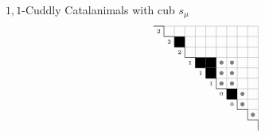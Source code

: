 \documentclass{beamer}
\newcounter{c}
\begin{document}
\begin{frame}{\(1,1\)-Cuddly Catalanimals with cub \(s_\mu\)}
\[\begin{array}{cr}
\begin{tikzpicture}[scale = .33]
\begin{scope}
\draw[draw = none, fill = gray!100] (7+0.5, -4-0.5) circle (.2);
\draw[draw = none, fill = gray!100] (8+0.5, -4-0.5) circle (.2);
\draw[draw = none, fill = gray!100] (7+0.5, -5-0.5) circle (.2);
\draw[draw = none, fill = gray!100] (8+0.5, -5-0.5) circle (.2);
\draw[draw = none, fill = gray!100] (7+0.5, -6-0.5) circle (.2);
\draw[draw = none, fill = gray!100] (8+0.5, -6-0.5) circle (.2);
\draw[draw = none, fill = gray!100] (9+0.5, -7-0.5) circle (.2);
\draw[draw = none, fill = gray!100] (9+0.5, -8-0.5) circle (.2);
\draw[draw = none, fill = gray!100] (10+0.5, -9-0.5) circle (.2);
\draw[thin, black!31] (1,-1) -- (11,-1);
\draw[thin, black!31] (2,-1) -- (2,-1);
\draw[thin, black!31] (2,-2) -- (11,-2);
\draw[thin, black!31] (3,-2) -- (3,-1);
\draw[thin, black!31] (3,-3) -- (11,-3);
\draw[thin, black!31] (4,-3) -- (4,-1);
\draw[thin, black!31] (4,-4) -- (11,-4);
\draw[thin, black!31] (5,-4) -- (5,-1);
\draw[thin, black!31] (5,-5) -- (11,-5);
\draw[thin, black!31] (6,-5) -- (6,-1);
\draw[thin, black!31] (6,-6) -- (11,-6);
\draw[thin, black!31] (7,-6) -- (7,-1);
\draw[thin, black!31] (7,-7) -- (11,-7);
\draw[thin, black!31] (8,-7) -- (8,-1);
\draw[thin, black!31] (8,-8) -- (11,-8);
\draw[thin, black!31] (9,-8) -- (9,-1);
\draw[thin, black!31] (9,-9) -- (11,-9);
\draw[thin, black!31] (10,-9) -- (10,-1);
\draw[thin, black!31] (10,-10) -- (11,-10);
\draw[thin, black!31] (11,-10) -- (11,-1);
\draw[draw = none, fill = black!100] (3,-2) rectangle (4,-3);
 \draw[draw = none, fill = black!100] (5,-4) rectangle (6,-5);
 \draw[draw = none, fill = black!100] (6,-4) rectangle (7,-5);
 \draw[draw = none, fill = black!100] (6,-5) rectangle (7,-6);
 \draw[draw = none, fill = black!100] (8,-7) rectangle (9,-8);
 \draw[thin] (1,-1) -- (2,-1);
\draw[thin] (2,-1) -- (2,-2);
\draw[thin] (2,-2) -- (3,-2);
\draw[thin] (3,-2) -- (3,-3);
\draw[thin] (3,-3) -- (4,-3);
\draw[thin] (4,-3) -- (4,-4);
\draw[thin] (4,-4) -- (5,-4);
\draw[thin] (5,-4) -- (5,-5);
\draw[thin] (5,-5) -- (6,-5);
\draw[thin] (6,-5) -- (6,-6);
\draw[thin] (6,-6) -- (7,-6);
\draw[thin] (7,-6) -- (7,-7);
\draw[thin] (7,-7) -- (8,-7);
\draw[thin] (8,-7) -- (8,-8);
\draw[thin] (8,-8) -- (9,-8);
\draw[thin] (9,-8) -- (9,-9);
\draw[thin] (9,-9) -- (10,-9);
\draw[thin] (10,-9) -- (10,-10);
\draw[thin] (10,-10) -- (11,-10);
\draw[thin] (11,-10) -- (11,-11);
\node at (3/2,-3/2) {\tiny $2 $};
\node at (5/2,-5/2) {\tiny $2 $};
\node at (7/2,-7/2) {\tiny $2 $};
\node at (9/2,-9/2) {\tiny $1 $};
\node at (11/2,-11/2) {\tiny $1 $};
\node at (13/2,-13/2) {\tiny $1 $};
\node at (15/2,-15/2) {\tiny $0 $};
\node at (17/2,-17/2) {\tiny $0 $};

\end{scope}
\end{tikzpicture}
\end{array}\]
\end{frame}
\end{document}
